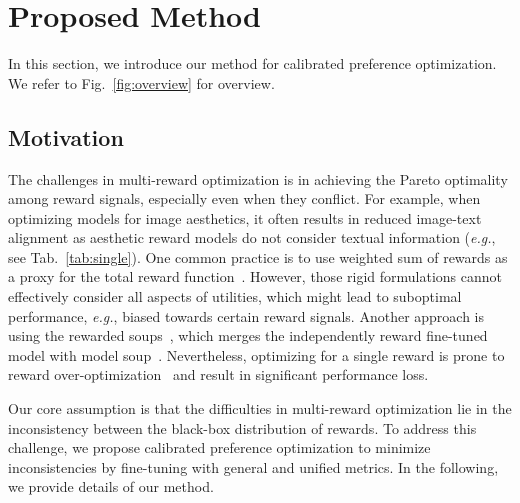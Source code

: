 % 

\section{Proposed Method}
In this section, we introduce our method for calibrated preference optimization. We refer to Fig.~\ref{fig:overview} for overview.

\subsection{Motivation}\label{sec:problem}
The challenges in multi-reward optimization is in achieving the Pareto optimality among reward signals, especially even when they conflict. 
For example, when optimizing models for image aesthetics, it often results in reduced image-text alignment as aesthetic reward models do not consider textual information (\emph{e.g.}, see Tab.~\ref{tab:single}). 
One common practice is to use weighted sum of rewards as a proxy for the total reward function~\citep{clark2023directly}.
However, those rigid formulations cannot effectively consider all aspects of utilities, which might lead to suboptimal performance, \emph{e.g.}, biased towards certain reward signals.
Another approach is using the rewarded soups~\citep{rame2024rewarded}, which merges the independently reward fine-tuned model with model soup~\citep{wortsman2022model}.
Nevertheless, optimizing for a single reward is prone to reward over-optimization~\citep{gao2023scaling, rafailov2024scaling} and result in significant performance loss.

Our core assumption is that the difficulties in multi-reward optimization lie in the inconsistency between the black-box distribution of rewards. 
To address this challenge, we propose calibrated preference optimization to minimize inconsistencies by fine-tuning with general and unified metrics. 
In the following, we provide details of our method.


